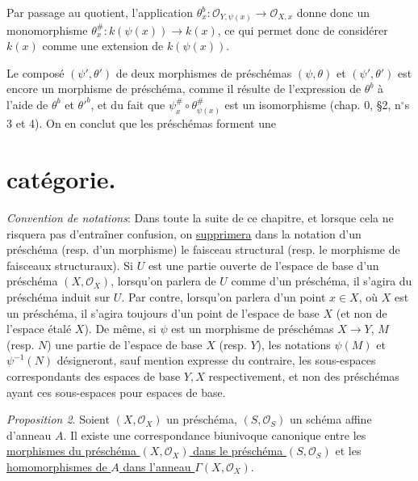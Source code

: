 Par passage au quotient, l'application $\theta_x^b: \mathcal{O}_{Y, \psi(x)} \to \mathcal{O}_{X,x}$ donne donc un monomorphisme $\theta_x^\#: k(\psi(x)) \to k(x)$, ce qui permet donc de considérer $k(x)$ comme une extension de $k(\psi(x))$.

Le composé $(\psi', \theta')$ de deux morphismes de préschémas $(\psi, \theta)$ et $(\psi', \theta')$ est encore un morphisme de préschéma, comme il résulte de l'expression de $\theta^{b}$ à l'aide de $\theta^b$ et $\theta'^b$, et du fait que $\psi_x^\# \circ \theta_{\psi(x)}^\#$ est un isomorphisme (chap. 0, §2, n$^\circ$s 3 et 4). On en conclut que les préschémas forment une

\newpage


\addtocounter{page}{23}
\section*{catégorie.}

\emph{Convention de notations}: Dans toute la suite de ce chapitre, et lorsque cela ne risquera pas d'entraîner confusion, on \underline{supprimera} dans la notation d'un préschéma (resp. d'un morphisme) le faisceau structural (resp. le morphisme de faisceaux structuraux). Si $U$ est une partie ouverte de l'espace de base d'un préschéma $(X, \mathcal{O}_X)$, lorsqu'on parlera de $U$ comme d'un préschéma, il s'agira du préschéma induit sur $U$. Par contre, lorsqu'on parlera d'un point $x \in X$, où $X$ est un préschéma, il s'agira toujours d'un point de l'espace de base $X$ (et non de l'espace étalé $X$). De même, si $\psi$ est un morphisme de préschémas $X \to Y$, $M$ (resp. $N$) une partie de l'espace de base $X$ (resp. $Y$), les notations $\psi(M)$ et $\psi^{-1}(N)$ désigneront, sauf mention expresse du contraire, les sous-espaces correspondants des espaces de base $Y, X$ respectivement, et non des préschémas ayant ces sous-espaces pour espaces de base.

\emph{Proposition 2}. Soient $(X, \mathcal{O}_X)$ un préschéma, $(S, \mathcal{O}_S)$ un schéma affine d'anneau $A$. Il existe une correspondance biunivoque canonique entre les \underline{morphismes du préschéma $(X, \mathcal{O}_X)$ dans le préschéma $(S, \mathcal{O}_S)$} et les \underline{homomorphismes de $A$ dans l'anneau $\Gamma(X, \mathcal{O}_X)$}.


